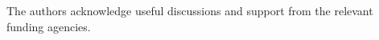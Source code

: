 \begin{acknowledgments}
The authors acknowledge useful discussions and support from the relevant funding agencies.
\end{acknowledgments}
